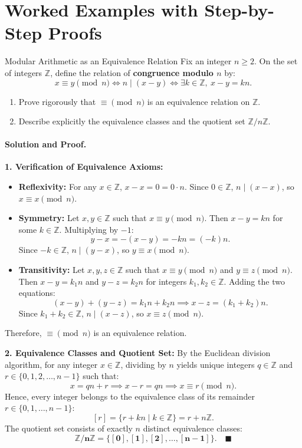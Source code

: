 \section{Worked Examples with Step-by-Step Proofs}

\begin{workedexample}{Modular Arithmetic as an Equivalence Relation}
Fix an integer $n \ge 2$. On the set of integers $\mathbb{Z}$, define the relation of \textbf{congruence modulo $n$} by:
\[
x \equiv y \pmod n \iff n \mid (x - y) \iff \exists k \in \mathbb{Z}, \ x - y = k n.
\]
\begin{enumerate}[leftmargin=1.4em,itemsep=2pt]
  \item Prove rigorously that $\equiv \pmod n$ is an equivalence relation on $\mathbb{Z}$.
  \item Describe explicitly the equivalence classes and the quotient set $\mathbb{Z} / n\mathbb{Z}$.
\end{enumerate}

\paragraph{Solution and Proof.}
\textbf{1. Verification of Equivalence Axioms:}
\begin{itemize}[leftmargin=1.4em,itemsep=2pt]
  \item \textbf{Reflexivity:} For any $x \in \mathbb{Z}$, $x - x = 0 = 0 \cdot n$. Since $0 \in \mathbb{Z}$, $n \mid (x - x)$, so $x \equiv x \pmod n$.
  \item \textbf{Symmetry:} Let $x, y \in \mathbb{Z}$ such that $x \equiv y \pmod n$.
  Then $x - y = k n$ for some $k \in \mathbb{Z}$. Multiplying by $-1$:
  \[
  y - x = -(x - y) = -k n = (-k) n.
  \]
  Since $-k \in \mathbb{Z}$, $n \mid (y - x)$, so $y \equiv x \pmod n$.
  \item \textbf{Transitivity:} Let $x, y, z \in \mathbb{Z}$ such that $x \equiv y \pmod n$ and $y \equiv z \pmod n$.
  Then $x - y = k_1 n$ and $y - z = k_2 n$ for integers $k_1, k_2 \in \mathbb{Z}$.
  Adding the two equations:
  \[
  (x - y) + (y - z) = k_1 n + k_2 n \implies x - z = (k_1 + k_2) n.
  \]
  Since $k_1 + k_2 \in \mathbb{Z}$, $n \mid (x - z)$, so $x \equiv z \pmod n$.
\end{itemize}
Therefore, $\equiv \pmod n$ is an equivalence relation.

\textbf{2. Equivalence Classes and Quotient Set:}
By the Euclidean division algorithm, for any integer $x \in \mathbb{Z}$, dividing by $n$ yields unique integers $q \in \mathbb{Z}$ and $r \in \{0, 1, 2, \dots, n-1\}$ such that:
\[
x = q n + r \implies x - r = q n \implies x \equiv r \pmod n.
\]
Hence, every integer belongs to the equivalence class of its remainder $r \in \{0, 1, \dots, n-1\}$:
\[
[r] = \{ r + k n \mid k \in \mathbb{Z} \} = r + n\mathbb{Z}.
\]
The quotient set consists of exactly $n$ distinct equivalence classes:
\[
\mathbf{\mathbb{Z} / n\mathbb{Z} = \{ [0], [1], [2], \dots, [n-1] \}}. \quad \blacksquare
\]
\end{workedexample}

